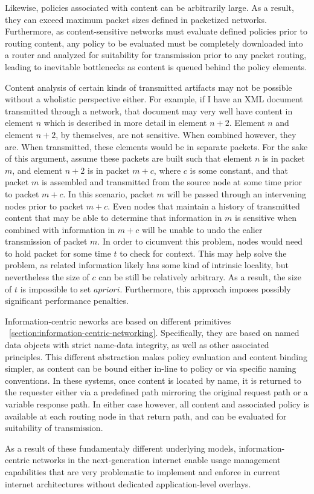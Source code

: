 Likewise, policies associated with content can be arbitrarily large.  As a result, they can exceed maximum packet sizes defined in packetized networks.  Furthermore, as content-sensitive networks must evaluate defined policies prior to routing content, any policy to be evaluated must be completely downloaded into a router and analyzed for suitability for transmission prior to any packet routing, leading to inevitable bottlenecks as content is queued behind the policy elements.

Content analysis of certain kinds of transmitted artifacts may not be possible without a wholistic perspective either.  For example, if I have an XML document transmitted through a network, that document may very well have content in element $n$ which is   described in more detail in element $n+2$.  Element $n$ and element $n+2$, by themselves, are not sensitive.  When combined however, they are.  When transmitted, these elements would be in separate packets.  For the sake of this argument, assume these packets are built such that element $n$ is in packet $m$, and element $n+2$ is in packet $m+c$, where $c$ is some constant, and that packet $m$ is assembled and transmitted from the source node at some time prior to packet $m+c$.  In this scenario, packet $m$ will be passed through an intervening nodes prior to packet $m+c$.  Even nodes that maintain a history of transmitted content that may be able to determine that information in $m$ is sensitive when combined with information in $m+c$ will be unable to undo the ealier transmission of packet $m$.  In order to cicumvent this problem, nodes would need to hold packet for some time $t$ to check for context.  This may help solve the problem, as related information likely has some kind of intrinsic locality, but nevertheless the size of $c$ can be still be relatively arbitrary.  As a result, the size of $t$ is impossible to set $a priori$.  Furthermore, this approach imposes possibly significant performance penalties.

Information-centric neworks are based on different primitives ~\ref{section:information-centric-networking}.  Specifically, they are based on named data objects with strict name-data integrity, as well as other associated principles.  This different abstraction makes policy evaluation and content binding simpler, as content can be bound either in-line to policy or via specific naming conventions.  In these systems, once content is located by name, it is returned to the requester either via a predefined path mirroring the original request path or a variable response path.  In either case however, all content and associated policy is available at each routing node in that return path, and can be evaluated for suitability of transmission.

As a result of these fundamentaly different underlying models, information-centric networks in the next-generation internet enable usage management capabilities that are very problematic to implement and enforce in current internet architectures without dedicated application-level overlays.